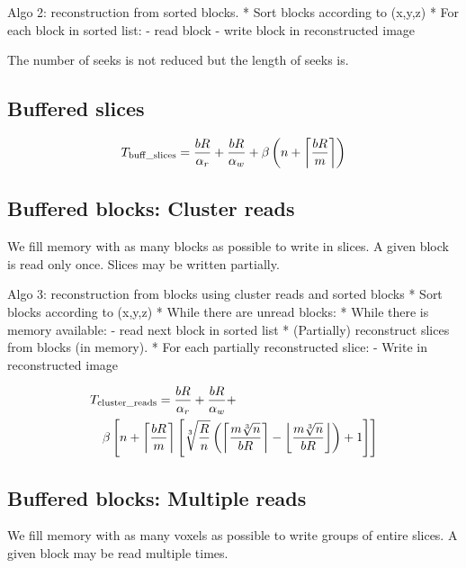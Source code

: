\documentclass[10pt, conference, compsocconf]{IEEEtran}
\DeclarePairedDelimiter{\ceil}{\lceil}{\rceil}
\DeclarePairedDelimiter{\floor}{\lfloor}{\rfloor}
\begin{document}
Algo 2: reconstruction from sorted blocks.
* Sort blocks according to (x,y,z)
* For each block in sorted list:
  - read block
  - write block in reconstructed image

The number of seeks is not reduced but the length of seeks is.

\subsection{Buffered slices}

\begin{equation}
T_\mathrm{buff\_slices} = \frac{bR}{\alpha_r}+\frac{bR}{\alpha_w}+\beta\left( n + \ceil*{\frac{bR}{m}}\right)
\end{equation}


\subsection{Buffered blocks: Cluster reads}

We fill memory with as many blocks as possible to write in slices. A
given block is read only once. Slices may be written partially.

Algo 3: reconstruction from blocks using cluster reads and sorted blocks
* Sort blocks according to (x,y,z)
* While there are unread blocks:
  * While there is memory available:
    - read next block in sorted list
  * (Partially) reconstruct slices from blocks (in memory).
  * For each partially reconstructed slice:
    - Write in reconstructed image

    \begin{equation}
      \begin{multlined}
  T_\mathrm{cluster\_reads} = \frac{bR}{\alpha_r}+\frac{bR}{\alpha_w} +\\
  \beta
  \left[n+ 
  \ceil*{\frac{bR}{m}} \left[
           \sqrt[3]{\frac{R}{n}} \left(
              \ceil*{\frac{m\sqrt[3]{n}}{bR}} - \floor*{\frac{m\sqrt[3]{n}}{bR}}
           \right)+1
             \right]
             \right]
             \end{multlined}
\end{equation}
    
\subsection{Buffered blocks: Multiple reads}

We fill memory with as many voxels as possible to write groups of
entire slices. A given block may be read multiple times.
\end{document}

